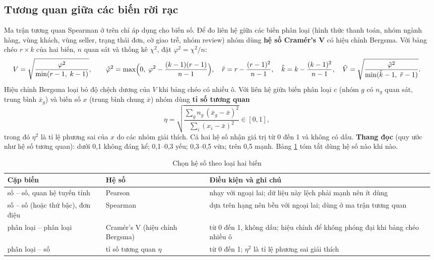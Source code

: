 \subsection{Tương quan giữa các biến rời rạc}\label{sec:tuong-quan-roi-rac}
Ma trận tương quan Spearman ở trên chỉ áp dụng cho biến số. Để đo liên hệ giữa các biến phân loại (hình thức thanh toán, nhóm ngành hàng, vùng khách, vùng seller, trạng thái đơn, cờ giao trễ, nhóm review) nhóm dùng \textbf{hệ số Cramér's V} có hiệu chỉnh Bergsma. Với bảng chéo $r \times k$ của hai biến, $n$ quan sát và thống kê $\chi^2$, đặt $\varphi^2 = \chi^2 / n$:
\[ V = \sqrt{\frac{\varphi^2}{\min(r-1,\; k-1)}}, \qquad
\tilde{\varphi}^2 = \max\Bigl(0,\; \varphi^2 - \frac{(k-1)(r-1)}{n-1}\Bigr), \quad
\tilde{r} = r - \frac{(r-1)^2}{n-1}, \quad \tilde{k} = k - \frac{(k-1)^2}{n-1}, \quad
\tilde{V} = \sqrt{\frac{\tilde{\varphi}^2}{\min(\tilde{k}-1,\; \tilde{r}-1)}}. \]
Hiệu chỉnh Bergsma loại bỏ độ chệch dương của $V$ khi bảng chéo có nhiều ô. Với liên hệ giữa biến phân loại $c$ (nhóm $g$ có $n_g$ quan sát, trung bình $\bar{x}_g$) và biến số $x$ (trung bình chung $\bar{x}$) nhóm dùng \textbf{tỉ số tương quan}
\[ \eta = \sqrt{\frac{\sum_g n_g\,(\bar{x}_g - \bar{x})^2}{\sum_i (x_i - \bar{x})^2}} \in [0, 1], \]
trong đó $\eta^2$ là tỉ lệ phương sai của $x$ do các nhóm giải thích. Cả hai hệ số nhận giá trị từ 0 đến 1 và không có dấu. \textbf{Thang đọc} (quy ước như hệ số tương quan): dưới 0,1 không đáng kể; 0,1--0,3 yếu; 0,3--0,5 vừa; trên 0,5 mạnh. Bảng \ref{tab:chon-he-so} tóm tắt dùng hệ số nào khi nào.
\begin{table}[htbp]\centering\scriptsize\caption{Chọn hệ số theo loại hai biến}\label{tab:chon-he-so}
\begin{tabular}{p{3.6cm}p{3.6cm}p{7.2cm}}\toprule
\textbf{Cặp biến} & \textbf{Hệ số} & \textbf{Điều kiện và ghi chú}\\\midrule
số -- số, quan hệ tuyến tính & Pearson & nhạy với ngoại lai; dữ liệu này lệch phải mạnh nên ít dùng\\
số -- số (hoặc thứ bậc), đơn điệu & Spearman & dựa trên hạng nên bền với ngoại lai; dùng ở ma trận tương quan\\
phân loại -- phân loại & Cramér's V (hiệu chỉnh Bergsma) & từ 0 đến 1, không dấu; hiệu chỉnh để không phóng đại khi bảng chéo nhiều ô\\
phân loại -- số & tỉ số tương quan $\eta$ & từ 0 đến 1; $\eta^2$ là tỉ lệ phương sai giải thích\\\bottomrule
\end{tabular}\end{table}
